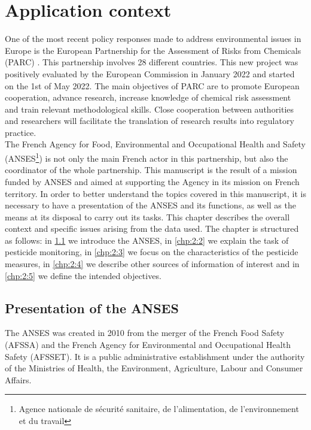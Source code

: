 \chapter{Application context}\label{chp:2}

\minitoc

\clearpage

One of the most recent policy responses made to address environmental issues in Europe is the European Partnership for the Assessment of Risks from Chemicals (PARC) \citep{PARC}. This partnership involves 28 different countries. This new project was positively evaluated by the European Commission in January 2022 and started on the 1st of May 2022. The main objectives of PARC are to promote European cooperation, advance research, increase knowledge of chemical risk assessment and train relevant methodological skills. Close cooperation between authorities and researchers will facilitate the translation of research results into regulatory practice. \\
The French Agency for Food, Environmental and Occupational Health and Safety (ANSES\footnote{Agence nationale de sécurité sanitaire, de l'alimentation, de l'environnement et du travail}) is not only the main French actor in this partnership, but also the coordinator of the whole partnership. This manuscript is the result of a mission funded by ANSES and aimed at supporting the Agency in its mission on French territory. In order to better understand the topics covered in this manuscript, it is necessary to have a presentation of the ANSES and its functions, as well as the means at its disposal to carry out its tasks. This chapter describes the overall context and specific issues arising from the data used. The chapter is structured as follows: in \ref{chp:2:1} we introduce the ANSES, in \ref{chp:2:2} we explain the task of pesticide monitoring, in \ref{chp:2:3} we focus on the characteristics of the pesticide measures, in \ref{chp:2:4} we describe other sources of information of interest and in \ref{chp:2:5} we define the intended objectives.

\section{Presentation of the ANSES}\label{chp:2:1}

The ANSES was created in 2010 from the merger of the French Food Safety (AFSSA) and the French Agency for Environmental and Occupational Health Safety (AFSSET). It is a public administrative establishment under the authority of the Ministries of Health, the Environment, Agriculture, Labour and Consumer Affairs.

